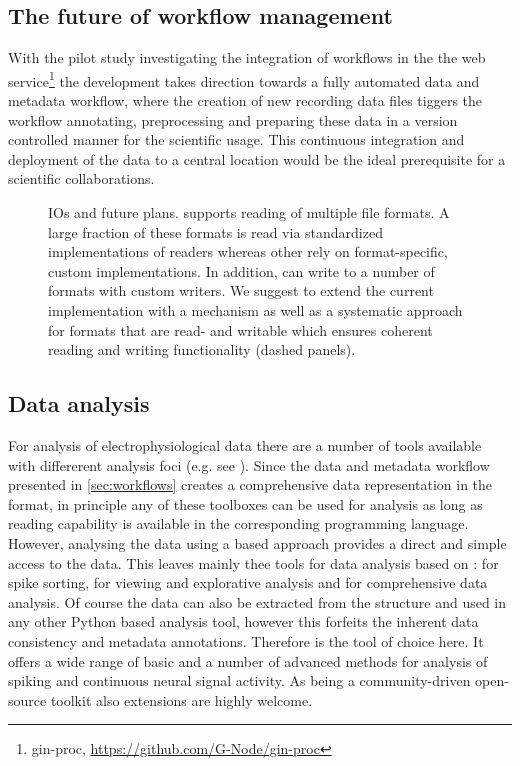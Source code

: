 \subsection{The future of workflow management}
With the pilot study investigating the integration of  workflows in the the  web service\footnote{gin-proc, \url{https://github.com/G-Node/gin-proc}} the development takes direction towards a fully automated data and metadata workflow, where the creation of new recording data files tiggers the workflow annotating, preprocessing and preparing these data in a version controlled manner for the scientific usage. This continuous integration and deployment of the data to a central location would be the ideal prerequisite for a scientific collaborations.

\begin{figure}
 
 \caption[ IOs and future plans]{ IOs and future plans.  supports reading of multiple file formats. A large fraction of these formats is read via standardized implementations of readers whereas other rely on format-specific, custom implementations. In addition,  can write to a number of formats with custom writers. We suggest to extend the current implementation with a  mechanism as well as a systematic  approach for formats that are read- and writable which ensures coherent reading and writing functionality (dashed panels).}
 \label{fig:disc_neo_plans}
\end{figure}

\subsection{Data analysis}
For analysis of electrophysiological data there are a number of tools available with differerent analysis foci (e.g. see \citet{Unakafova_2019}). Since the data and metadata workflow presented in \ref{sec:workflows} creates a comprehensive data representation in the  format, in principle any of these toolboxes can be used for analysis as long as  reading capability is available in the corresponding programming language. However, analysing the data using a  based approach provides a direct and simple access to the data. This leaves mainly thee tools for data analysis based on :  for spike sorting,  for viewing and explorative analysis and  for comprehensive data analysis. Of course the data can also be extracted from the  structure and used in any other Python based analysis tool, however this forfeits the inherent data consistency and metadata annotations. Therefore  is the tool of choice here. It offers a wide range of basic and a number of advanced methods for analysis of spiking and continuous neural signal activity. As  being a community-driven open-source toolkit also extensions are highly welcome.

